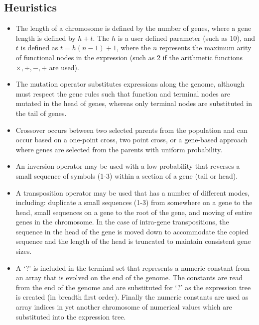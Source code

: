 \subsection{Heuristics}
\begin{itemize}
	\item The length of a chromosome is defined by the number of genes, where a gene length is defined by $h + t$. The $h$ is a user defined parameter (such as 10), and $t$ is defined as $t = h (n-1) + 1$, where the $n$ represents the maximum arity of functional nodes in the expression (such as 2 if the arithmetic functions $\times, \div, -, +$ are used).
	\item The mutation operator substitutes expressions along the genome, although must respect the gene rules such that function and terminal nodes are mutated in the head of genes, whereas only terminal nodes are substituted in the tail of genes.
	\item Crossover occurs between two selected parents from the population and can occur based on a one-point cross, two point cross, or a gene-based approach where genes are selected from the parents with uniform probability.
	\item An inversion operator may be used with a low probability that reverses a small sequence of symbols (1-3) within a section of a gene (tail or head). 
	\item A transposition operator may be used that has a number of different modes, including: duplicate a small sequences (1-3) from somewhere on a gene to the head, small sequences on a gene to the root of the gene, and moving of entire genes in the chromosome. In the case of intra-gene transpositions, the sequence in the head of the gene is moved down to accommodate the copied sequence and the length of the head is truncated to maintain consistent gene sizes.
	\item A `?' is included in the terminal set that represents a numeric constant from an array that is evolved on the end of the genome. The constants are read from the end of the genome and are substituted for `?' as the expression tree is created (in breadth first order). Finally the numeric constants are used as array indices in yet another chromosome of numerical values which are substituted into the expression tree.

\end{itemize}
